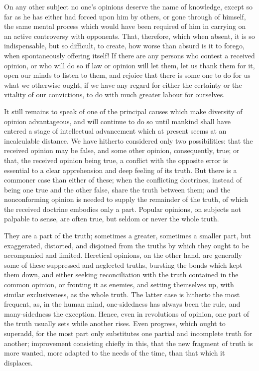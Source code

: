 On any other subject no one’s opinions deserve the name of knowledge, except so far as he has either had forced upon him by others, or gone through of himself, the same mental process which would have been required of him in carrying on an active controversy with opponents. That, therefore, which when absent, it is so indispensable, but so difficult, to create, how worse than absurd is it to forego, when spontaneously offering itself! If there are any persons who contest a received opinion, or who will do so if law or opinion will let them, let us thank them for it, open our minds to listen to them, and rejoice that there is some one to do for us what we otherwise ought, if we have any regard for either the certainty or the vitality of our convictions, to do with much greater labour for ourselves.\par

It still remains to speak of one of the principal causes which make diversity of opinion advantageous, and will continue to do so until mankind shall have entered a stage of intellectual advancement which at present seems at an incalculable distance. We have hitherto considered only two possibilities: that the received opinion may be false, and some other opinion, consequently, true; or that, the received opinion being true, a conflict with the opposite error is essential to a clear apprehension and deep feeling of its truth. But there is a commoner case than either of these; when the conflicting doctrines, instead of being one true and the other false, share the truth between them; and the nonconforming opinion is needed to supply the remainder of the truth, of which the received doctrine embodies only a part. Popular opinions, on subjects not palpable to sense, are often true, but seldom or never the whole truth.\par

They are a part of the truth; sometimes a greater, sometimes a smaller part, but exaggerated, distorted, and disjoined from the truths by which they ought to be accompanied and limited. Heretical opinions, on the other hand, are generally some of these suppressed and neglected truths, bursting the bonds which kept them down, and either seeking reconciliation with the truth contained in the common opinion, or fronting it as enemies, and setting themselves up, with similar exclusiveness, as the whole truth. The latter case is hitherto the most frequent, as, in the human mind, one-sidedness has always been the rule, and many-sidedness the exception. Hence, even in revolutions of opinion, one part of the truth usually sets while another rises. Even progress, which ought to superadd, for the most part only substitutes one partial and incomplete truth for another; improvement consisting chiefly in this, that the new fragment of truth is more wanted, more adapted to the needs of the time, than that which it displaces.\par

